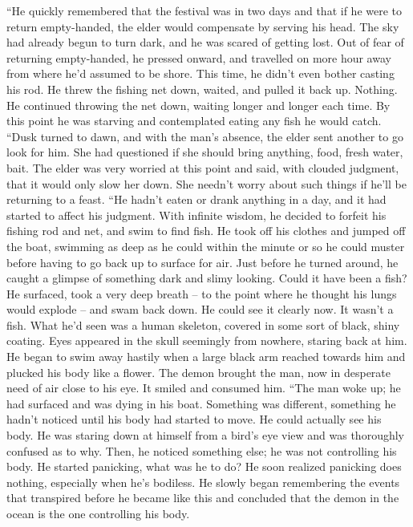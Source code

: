 \documentclass[openany, 12pt]{book}
\newcommand\tab[1][1cm]{\hspace*{#1}}
\begin{document}
\newline
\tab
``He quickly remembered that the festival was in two days and that if he were to return empty-handed, the elder would compensate by serving his head. The sky had already begun to turn dark, and he was scared of getting lost. Out of fear of returning empty-handed, he pressed onward, and travelled on more hour away from where he’d assumed to be shore. This time, he didn’t even bother casting his rod. He threw the fishing net down, waited, and pulled it back up. Nothing. He continued throwing the net down, waiting longer and longer each time. By this point he was starving and contemplated eating any fish he would catch.
\newline
\tab
``Dusk turned to dawn, and with the man’s absence, the elder sent another to go look for him. She had questioned if she should bring anything, food, fresh water, bait. The elder was very worried at this point and said, with clouded judgment, that it would only slow her down. She needn’t worry about such things if he’ll be returning to a feast.
\newline
\tab
``He hadn’t eaten or drank anything in a day, and it had started to affect his judgment. With infinite wisdom, he decided to forfeit his fishing rod and net, and swim to find fish.  He took off his clothes and jumped off the boat, swimming as deep as he could within the minute or so he could muster before having to go back up to surface for air. Just before he turned around, he caught a glimpse of something dark and slimy looking. Could it have been a fish? He surfaced, took a very deep breath -- to the point where he thought his lungs would explode -- and swam back down. He could see it clearly now. It wasn’t a fish. What he’d seen was a human skeleton, covered in some sort of black, shiny coating. Eyes appeared in the skull seemingly from nowhere, staring back at him. He began to swim away hastily when a large black arm reached towards him and plucked his body like a flower. The demon brought the man, now in desperate need of air close to his eye. It smiled and consumed him.
\newline
\tab
``The man woke up; he had surfaced and was dying in his boat. Something was different, something he hadn’t noticed until his body had started to move. He could actually see his body. He was staring down at himself from a bird’s eye view and was thoroughly confused as to why. Then, he noticed something else; he was not controlling his body. He started panicking, what was he to do? He soon realized panicking does nothing, especially when he’s bodiless. He slowly began remembering the events that transpired before he became like this and concluded that the demon in the ocean is the one controlling his body. 
\end{document}
